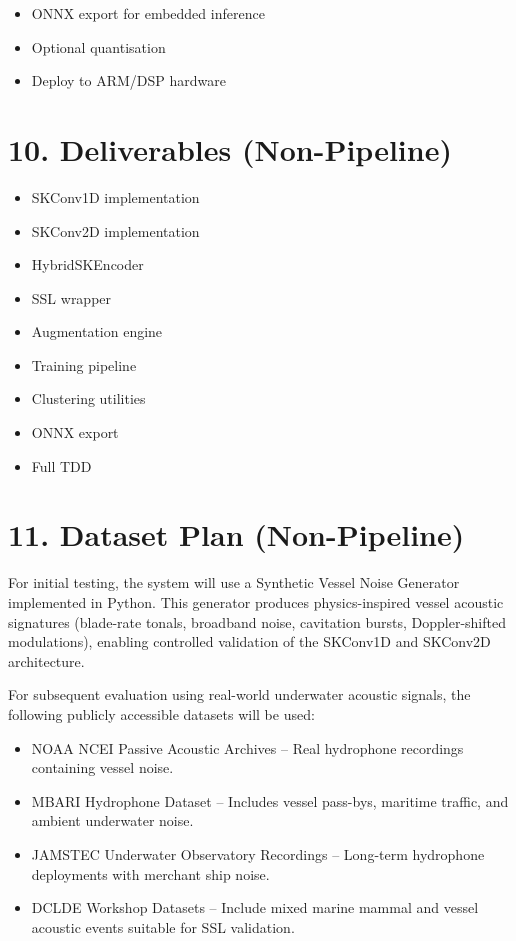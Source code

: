 \documentclass[11pt,a4paper]{article}
\begin{document}
\begin{itemize}
\item ONNX export for embedded inference
\item Optional quantisation
\item Deploy to ARM/DSP hardware
\end{itemize}

\section*{10. Deliverables (Non-Pipeline)}

\begin{itemize}
\item SKConv1D implementation
\item SKConv2D implementation
\item HybridSKEncoder
\item SSL wrapper
\item Augmentation engine
\item Training pipeline
\item Clustering utilities
\item ONNX export
\item Full TDD
\end{itemize}

\section*{11. Dataset Plan (Non-Pipeline)}

For initial testing, the system will use a Synthetic Vessel Noise Generator implemented in Python.
This generator produces physics-inspired vessel acoustic signatures (blade-rate tonals, broadband noise,
cavitation bursts, Doppler-shifted modulations), enabling controlled validation of the SKConv1D and
SKConv2D architecture.

For subsequent evaluation using real-world underwater acoustic signals, the following publicly accessible datasets will be used:
\begin{itemize}
\item NOAA NCEI Passive Acoustic Archives -- Real hydrophone recordings containing vessel noise.
\item MBARI Hydrophone Dataset -- Includes vessel pass-bys, maritime traffic, and ambient underwater noise.
\item JAMSTEC Underwater Observatory Recordings -- Long-term hydrophone deployments with merchant ship noise.
\item DCLDE Workshop Datasets -- Include mixed marine mammal and vessel acoustic events suitable for SSL validation.
\end{itemize}
\end{document}
